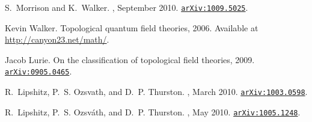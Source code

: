 \documentclass{pnastwo}
\newcommand{\arxiv}[1]{\href{http://arxiv.org/abs/#1}{\tt arXiv:\nolinkurl{#1}}}
\begin{document}
\begin{article}





%
%

\newcommand{\noopsort}[1]{}\def\cprime{$'$} \def\cprime{$'$} \def\cprime{$'$}
\begin{thebibliography}{10}

S.~{Morrison} and K.~{Walker}.
, September 2010.
\newblock \arxiv{1009.5025}.

Kevin Walker.
\newblock Topological quantum field theories, 2006.
\newblock Available at \url{http://canyon23.net/math/}.

Jacob Lurie.
\newblock On the classification of topological field theories, 2009.
\newblock \arxiv{0905.0465}.

R.~{Lipshitz}, P.~S. {Ozsvath}, and D.~P. {Thurston}.
, March 2010.
\newblock \arxiv{1003.0598}.

R.~{Lipshitz}, P.~S. {Ozsv{\'a}th}, and D.~P. {Thurston}.
, May 2010.
\newblock \arxiv{1005.1248}.


\end{thebibliography}
\end{article}
\end{document}
